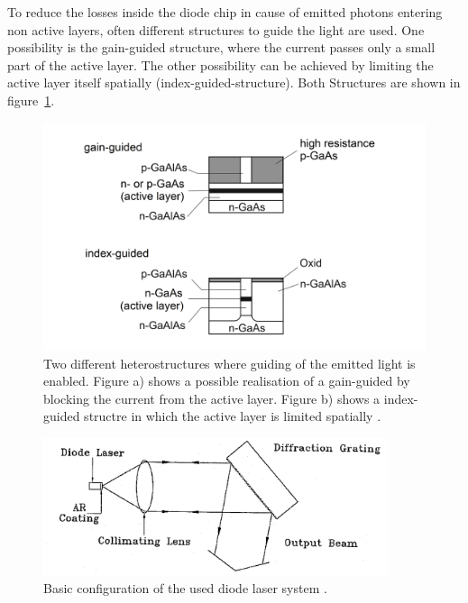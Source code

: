 To reduce the losses inside the diode chip in cause of emitted photons entering
non active layers, often different structures to guide the light are used.
One possibility is the gain-guided structure, where the current passes only a
small part of the active layer. The other possibility can be achieved by limiting
the active layer itself spatially (index-guided-structure). Both Structures are
shown in figure~\ref{fig:guided}.
\begin{figure}
  \centering
  \includegraphics[width = \textwidth]{Pics/guided.png}
  \caption{Two different heterostructures where guiding of the emitted light is
  enabled. Figure a) shows a possible realisation of a gain-guided by blocking
  the current from the active layer. Figure b) shows a index-guided structre in
  which the active layer is limited spatially \cite{Eichler}. }
  \label{fig:guided}
\end{figure}
\begin{figure}
  \centering
  \includegraphics[width = 0.9\textwidth]{Pics/setup.png}
  \caption{Basic configuration of the used diode laser system \cite{anleitung}.}
  \label{fig:setup}
\end{figure}

